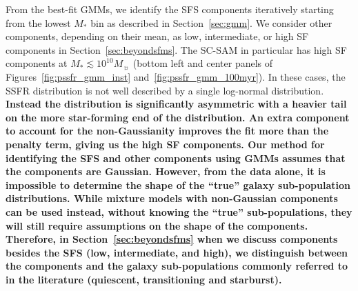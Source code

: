 \documentclass[tighten, preprint]{aastex62}
\begin{document}

From the best-fit GMMs, we identify the SFS components iteratively starting 
from the lowest $M_*$ bin as described in Section~\ref{sec:gmm}. We 
consider other components, depending on their mean, as low, intermediate, or high 
SF components in Section~\ref{sec:beyondsfms}. The SC-SAM in particular has 
high SF components at $M_* \lesssim 10^{10}M_\sun$ (bottom left and center 
panels of Figures~\ref{fig:pssfr_gmm_inst}  and~\ref{fig:pssfr_gmm_100myr}).
In these cases, the SSFR distribution is not well described by a single log-normal distribution.
{\bf \color{red}
Instead the distribution is significantly asymmetric with a 
heavier tail on the more star-forming end of the distribution. 
An extra component to account for the non-Gaussianity improves 
the fit more than the penalty term, giving us the high SF components.
Our method for identifying the SFS and other components using GMMs 
assumes that the components are Gaussian. However, from the data 
alone, it is impossible to determine the shape of the ``true'' 
galaxy sub-population distributions. While mixture models with 
non-Gaussian components can be used instead, without knowing the 
``true'' sub-populations, they will still require assumptions on 
the shape of the components. Therefore, in Section~\ref{sec:beyondsfms} 
when we discuss components besides the SFS (low, intermediate, and high), 
we distinguish between the components and the galaxy sub-populations 
commonly referred to in the literature (quiescent, transitioning and 
starburst). 
}

\end{document}
